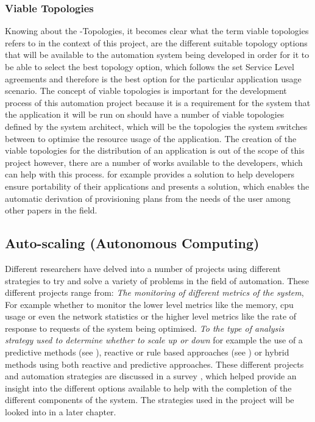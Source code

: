 \subsubsection{Viable Topologies}
Knowing about the \textalpha-Topologies, it becomes clear what the term viable topologies refers to in the context of this project, are the different suitable topology options that will be available to the automation system being developed in order for it to be able to select the best topology option, which follows the set Service Level agreements and therefore is the best option for the particular application usage scenario. The concept of viable topologies is important for the development process of this automation project because it is a requirement for the system that the application it will be run on should have a number of viable topologies defined by the system architect, which will be the topologies the system switches between to optimise the resource usage of the application. The creation of the viable topologies for the distribution of an application is out of the scope of this project however, there are a number of works available to the developers, which can help with this process. \cite{binz2012portable} for example provides a solution to help developers ensure portability of their applications and \cite{garcia2017automated} presents a solution, which enables the automatic derivation of provisioning plans from the needs of the user among other papers in the field.

\subsection{Auto-scaling (Autonomous Computing)}
Different researchers have delved into a number of projects using different strategies to try and solve a variety of problems in the field of automation. These different projects range from: \textit{The monitoring of different metrics of the system}, For example whether to monitor the lower level metrics like the memory, cpu usage or even the network statistics or the higher level metrics like the rate of response to requests of the system being optimised. \textit{To the type of analysis strategy used to determine whether to scale up or down} for example the use of a predictive methods (see \cite{loff2014vadara}), reactive or rule based approaches (see \cite{amazon}) or hybrid methods using both reactive and predictive approaches. These different projects and automation strategies are discussed in a survey \cite{qu2018auto}, which helped provide an insight into the different options available to help with the completion of the different components of the system. The strategies used in the project will be looked into in a later chapter.

